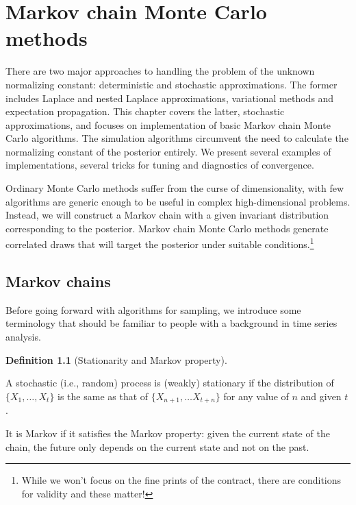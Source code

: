 \documentclass[
  11pt,
  letterpaper,
]{scrbook}
\theoremstyle{definition}
\theoremstyle{definition}
\theoremstyle{definition}
\newtheorem{definition}{Definition}[chapter]
\theoremstyle{plain}
\theoremstyle{plain}
\theoremstyle{remark}
\begin{document}

\chapter{Markov chain Monte Carlo
methods}\label{markov-chain-monte-carlo-methods}

There are two major approaches to handling the problem of the unknown
normalizing constant: deterministic and stochastic approximations. The
former includes Laplace and nested Laplace approximations, variational
methods and expectation propagation. This chapter covers the latter,
stochastic approximations, and focuses on implementation of basic Markov
chain Monte Carlo algorithms. The simulation algorithms circumvent the
need to calculate the normalizing constant of the posterior entirely. We
present several examples of implementations, several tricks for tuning
and diagnostics of convergence.

Ordinary Monte Carlo methods suffer from the curse of dimensionality,
with few algorithms are generic enough to be useful in complex
high-dimensional problems. Instead, we will construct a Markov chain
with a given invariant distribution corresponding to the posterior.
Markov chain Monte Carlo methods generate correlated draws that will
target the posterior under suitable conditions.\footnote{While we won't
  focus on the fine prints of the contract, there are conditions for
  validity and these matter!}

\section{Markov chains}\label{markov-chains}

Before going forward with algorithms for sampling, we introduce some
terminology that should be familiar to people with a background in time
series analysis.

\begin{definition}[Stationarity and Markov
property]\protect\hypertarget{def-weak-stationarity}{}\label{def-weak-stationarity}

A stochastic (i.e., random) process is (weakly) stationary if the
distribution of \(\{X_1, \ldots, X_t\}\) is the same as that of
\(\{X_{n+1}, \ldots X_{t+n}\}\) for any value of \(n\) and given \(t\).

It is Markov if it satisfies the Markov property: given the current
state of the chain, the future only depends on the current state and not
on the past.

\end{definition}
\end{document}
